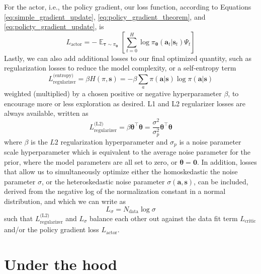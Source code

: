 \documentclass{article}
\begin{document}
For the actor, i.e., the policy gradient, our loss function, according to Equations  \ref{eq:simple_gradient_update}, \ref{eq:policy_gradient_theorem}, and \ref{eq:policty_gradient_update}, is \begin{equation}L_\text{actor}=-\mathop{\mathbb{E}}_{\boldsymbol{\tau}\sim\pi_{\boldsymbol{\theta}}}\left[\sum_{t=0}^H\log\pi_{\boldsymbol{\theta}}(\mathbf{a}_t|\mathbf{s}_t)\Psi_t\right]\end{equation} Lastly, we can also add additional losses to our final optimized quantity, such as regularization losses to reduce the model complexity, or a self-entropy term \begin{equation}L_\text{regularizer}^\text{(entropy)}=\beta H(\pi, \mathbf{s})=-\beta \sum_a\pi(\mathbf{a}|\mathbf{s})\log\pi(\mathbf{a}|\mathbf{s})\end{equation} weighted (multiplied) by a chosen positive or negative hyperparameter $\beta$, to encourage more or less exploration as desired.  L1 and L2 regularizer losses are always available, written as \begin{equation}L_\text{regularizer}^{\text{(L2)}}=\beta\boldsymbol{\theta}^\top\boldsymbol{\theta}=\frac{\sigma^2}{\sigma_p^2}\boldsymbol{\theta}^\top\boldsymbol{\theta}\end{equation} where $\beta$ is the $L2$ regularization hyperparameter and $\sigma_p$ is a noise parameter scale hyperparameter which is equivalent to the average noise parameter for the prior, where the model parameters are all set to zero, or $\boldsymbol{\theta}=\mathbf{0}$. In addition, losses that allow us to simultaneously optimize either the homoskedastic the noise parameter $\sigma$, or the heteroskedastic noise parameter $\sigma(\mathbf{a},\mathbf{s})$, can be included, derived from the negative log of the normalization constant in a normal distribution, and which we can write as \begin{equation}L_\sigma=N_\text{data}\log\sigma\end{equation}such that $L_\text{regularizer}^\text{(L2)}$ and $L_\sigma$ balance each other out against the data fit term $L_\text{critic}$ and/or the policy gradient loss $L_\text{actor}$.

\section{Under the hood}
\end{document}
